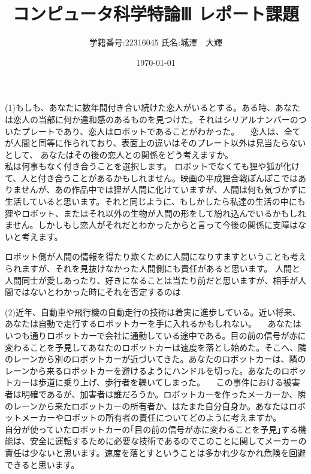 \documentclass[11pt,a4paper]{jsarticle}
\title{コンピュータ科学特論Ⅲ レポート課題}
\author{学籍番号:22316045 
氏名:城澤　大輝}
\date{\today}
\begin{document}
\maketitle
%
%

(1)もしも、あなたに数年間付き合い続けた恋人がいるとする。ある時、あなたは恋人の当部に何か違和感のあるものを見つけた。それはシリアルナンバーのついたプレートであり、恋人はロボットであることがわかった。
　恋人は、全てが人間と同等に作られており、表面上の違いはそのプレート以外は見当たらないとして、
あなたはその後の恋人との関係をどう考えますか。\\


私は何事もなく付き合うことを選択します。
ロボットでなくても狸や狐が化けて、人と付き合うことがあるかもしれません。映画の平成狸合戦ぽんぽこではありませんが、あの作品中では狸が人間に化けていますが、人間は何も気づかずに生活していると思います。それと同じように、もしかしたら私達の生活の中にも狸やロボット、またはそれ以外の生物が人間の形をして紛れ込んでいるかもしれません。しかしもし恋人がそれだとわかったからと言って今後の関係に支障はないと考えます。

ロボット側が人間の情報を得たり欺くために人間になりすますということも考えられますが、それを見抜けなかった人間側にも責任があると思います。
人間と人間同士が愛しあったり、好きになることは当たり前だと思いますが、相手が人間ではないとわかった時にそれを否定するのは 


\newpage

(2)近年、自動車や飛行機の自動走行の技術は着実に進歩している。近い将来、あなたは自動で走行するロボットカーを手に入れるかもしれない。
　あなたはいつも通りロボットカーで会社に通勤している途中である。目の前の信号が赤に変わることを予見してあなたのロボットカーは速度を落とし始めた。そこへ、隣のレーンから別のロボットカーが近づいてきた。あなたのロボットカーは、隣のレーンから来るロボットカーを避けるようにハンドルを切った。あなたのロボットカーは歩道に乗り上げ、歩行者を轢いてしまった。
　この事件における被害者は明確であるが、加害者は誰だろうか。ロボットカーを作ったメーカーか、隣のレーンから来たロボットカーの所有者か、はたまた自分自身か。あなたはロボットメーカーやロボットの所有者の責任についてどのように考えますか。\\
 
自分が使っていたロボットカーの｢目の前の信号が赤に変わることを予見｣する機能は、安全に運転するために必要な技術であるのでこのことに関してメーカーの責任は少ないと思います。速度を落とすということは多かれ少なかれ危険を回避できると思います。
\end{document}
